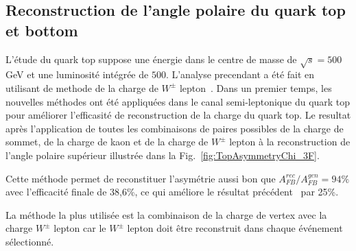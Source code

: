 \newpage
\subsection*{Reconstruction de l'angle polaire du quark top et bottom}
L’\'etude du quark top suppose une \'energie dans le centre de masse de $\sqrt{s} = 500$\,GeV et une luminosit\'e int\'egr\'ee de $500$\ifb. L'analyse precendant a \'et\'e fait  en utilisant de methode de la charge de $W^\pm$ lepton~\cite{bib:ILCTOP}.
Dans un premier temps, les nouvelles méthodes ont été appliquées dans le canal semi-leptonique du  quark top pour améliorer l'efficasit\'e de reconstruction de la charge du quark top.
Le resultat après l'application de toutes les combinaisons de paires possibles de la charge de sommet, de la charge de kaon et de la charge de $W^\pm$ lepton à la reconstruction de l'angle polaire supérieur illustrée dans la Fig.~\ref {fig:TopAsymmetryChi_3F}.

Cette méthode permet de reconstituer l'asymétrie aussi bon que $A_ {FB}^{rec} / A^{gen}_{FB} = 94\%$ avec l'efficacité finale de 38,6\%, ce qui améliore le résultat précédent~\cite{bib:ILCTOP} par 25\%.

La méthode la plus utilisée est la combinaison de la charge de vertex avec la charge $W^\pm$ lepton car le $ W^\pm$ lepton doit être reconstruit dans chaque événement sélectionné.

